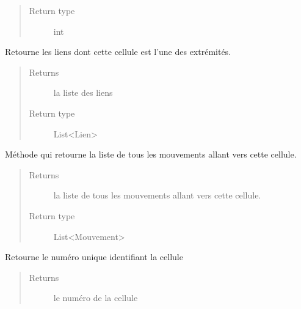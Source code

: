 \documentclass[letterpaper,10pt,english]{sphinxmanual}
\begin{document}
\begin{fulllineitems}
\begin{fulllineitems}
\begin{quote}
\begin{description}
\item[{Return type}] \leavevmode
int

\end{description}\end{quote}

\end{fulllineitems}


\begin{fulllineitems}
\label{index:Cellule.Cellule.getLiens}
Retourne les liens dont cette cellule est l'une des extrémités.
\begin{quote}\begin{description}
\item[{Returns}] \leavevmode
la liste des liens

\item[{Return type}] \leavevmode
List\textless{}Lien\textgreater{}

\end{description}\end{quote}

\end{fulllineitems}


\begin{fulllineitems}
\label{index:Cellule.Cellule.getMouvementsVersCellule}
Méthode qui retourne la liste de tous les mouvements allant vers cette cellule.
\begin{quote}\begin{description}
\item[{Returns}] \leavevmode
la liste de tous les mouvements allant vers cette cellule.

\item[{Return type}] \leavevmode
List\textless{}Mouvement\textgreater{}

\end{description}\end{quote}

\end{fulllineitems}


\begin{fulllineitems}
\label{index:Cellule.Cellule.getNumero}
Retourne le numéro unique identifiant la cellule
\begin{quote}\begin{description}
\item[{Returns}] \leavevmode
le numéro de la cellule


\end{description}
\end{quote}
\end{fulllineitems}
\end{fulllineitems}
\end{document}
